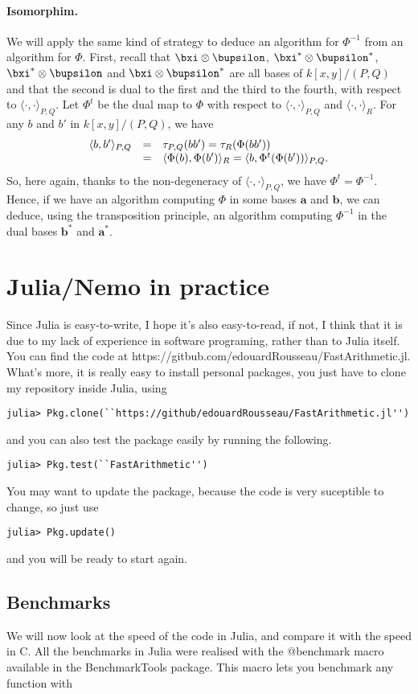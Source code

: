 \documentclass[a4paper,11pt]{article}
\theoremstyle{break}
\theoremstyle{definition}
\theoremstyle{remark}
\newcommand{\ps}[2]{\langle#1,#2\rangle}
\newcommand{\psdot}{\ps{\cdot}{\cdot}}
\begin{document}
\paragraph{Isomorphim.} We will apply the same kind of strategy to deduce an 
algorithm for $\Phi^{-1}$ from an algorithm for $\Phi$. First, recall that 
$\bxi\otimes\bupsilon$, $\bxi^*\otimes\bupsilon^*$, $\bxi^*\otimes\bupsilon$ 
and $\bxi\otimes\bupsilon^*$ are all bases of $k[x,y]/(P,Q)$ and that the 
second is dual to the first and the third to the fourth, with respect to 
$\psdot_{P,Q}$. Let $\Phi^t$ be the dual map to $\Phi$ with respect to 
$\psdot_{P,Q}$ and $\psdot_R$. For any $b$ and $b'$ in $k[x,y]/(P,Q)$, we have
\[
\begin{array}[here]{rcl}
  \ps{b}{b'}_{P,Q} &=& \tau_{P,Q}(bb') = \tau_R(\Phi(bb')) \\
  &=& \ps{\Phi(b)}{\Phi(b')}_R = \ps{b}{\Phi^t(\Phi(b'))}_{P,Q}.
\end{array}
\]
So, here again, thanks to the non-degeneracy of $\psdot_{P,Q}$, we have 
$\Phi^t=\Phi^{-1}$. Hence, if we have an algorithm computing $\Phi$ in  
some bases $\textbf{a}$ and $\textbf{b}$, we can deduce, using the 
transposition principle, an algorithm computing $\Phi^{-1}$ in the dual bases 
$\textbf{b}^*$ and $\textbf{a}^*$.


\section{Julia/Nemo in practice}
Since Julia is easy-to-write, I hope it's also
easy-to-read, if not, I think that it is due to my lack of experience in
software programing, rather than to Julia itself. You can find the code
at
https://gitbub.com/edouardRousseau/FastArithmetic.jl. What's more, it is really
easy to install personal packages, you just have to clone my repository
inside Julia, using
\begin{verbatim}
julia> Pkg.clone(``https://github/edouardRousseau/FastArithmetic.jl'') 
\end{verbatim}
and you can also test the package easily by running the following.
\begin{verbatim}
julia> Pkg.test(``FastArithmetic'') 
\end{verbatim}
You may want to update the package, because the code is very suceptible to 
change, so just use
\begin{verbatim}
julia> Pkg.update()
\end{verbatim}
and you will be ready to start again. 
\subsection{Benchmarks}
We will now look at the speed of the code in Julia, and compare it with
the speed in C. All the benchmarks in Julia were realised with the
@benchmark macro available in the BenchmarkTools package. This macro lets you
benchmark any function with 
\end{document}
